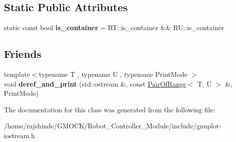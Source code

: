 \subsection*{Static Public Attributes}
\begin{DoxyCompactItemize}
\item 
static const bool {\bfseries is\+\_\+container} = R\+T\+::is\+\_\+container \&\& R\+U\+::is\+\_\+container\hypertarget{classgnuplotio_1_1_pair_of_range_ab49c6567f0fa6a82fa2a6245fd964659}{}\label{classgnuplotio_1_1_pair_of_range_ab49c6567f0fa6a82fa2a6245fd964659}

\end{DoxyCompactItemize}
\subsection*{Friends}
\begin{DoxyCompactItemize}
\item 
{\footnotesize template$<$typename T , typename U , typename Print\+Mode $>$ }\\void {\bfseries deref\+\_\+and\+\_\+print} (std\+::ostream \&, const \hyperlink{classgnuplotio_1_1_pair_of_range}{Pair\+Of\+Range}$<$ T, U $>$ \&, Print\+Mode)\hypertarget{classgnuplotio_1_1_pair_of_range_aada62f803432f04aff66f3c609329520}{}\label{classgnuplotio_1_1_pair_of_range_aada62f803432f04aff66f3c609329520}

\end{DoxyCompactItemize}


The documentation for this class was generated from the following file\+:\begin{DoxyCompactItemize}
\item 
/home/rajshinde/\+G\+M\+O\+C\+K/\+Robot\+\_\+\+Controller\+\_\+\+Module/include/gnuplot-\/iostream.\+h\end{DoxyCompactItemize}
